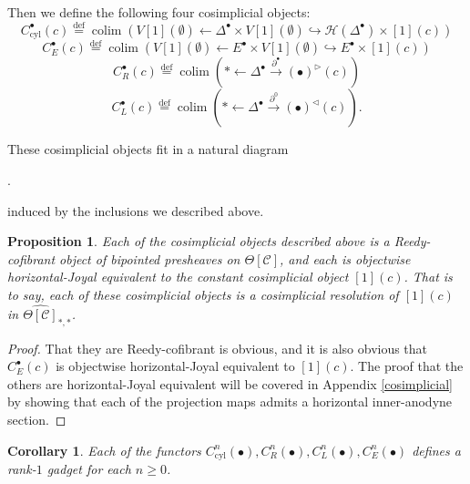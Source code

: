 \documentclass{amsart}
\numberwithin{equation}{section}
\theoremstyle{plain}   %
\newtheorem{prop}[subsection]{Proposition}
\newtheorem{cor}[subsection]{Corollary}
\theoremstyle{remark}
\theoremstyle{plain}
\DeclareMathOperator{\colim}{colim}
\newcommand{\C}{\ensuremath{\mathcal{C}}}
\newcommand{\defeq}{\overset{\mathrm{def}}=}
\newcommand{\cellset}{\ensuremath{\widehat{\Theta[\mathcal{C}]}}}
\begin{document}
Then we define the following four cosimplicial objects:
\[C^\bullet_{\mathrm{cyl}}(c)\defeq \colim \left( V[1](\emptyset) \leftarrow \Delta^\bullet \times V[1](\emptyset) \hookrightarrow \mathscr{H}(\Delta^\bullet)\times [1](c)\right)\]
\[C^\bullet_{E}(c)\defeq \colim \left( V[1](\emptyset) \leftarrow E^\bullet \times V[1](\emptyset) \hookrightarrow E^\bullet\times [1](c)\right)\]
\[C^\bullet_{R}(c)\defeq \colim \left( \ast \leftarrow \Delta^\bullet \xrightarrow{\partial^{\bullet}} (\bullet)^\triangleright(c)\right)\]
\[C^\bullet_{L}(c)\defeq \colim \left( \ast \leftarrow \Delta^\bullet \xrightarrow{\partial^0} (\bullet)^\triangleleft(c)\right).\]

These cosimplicial objects fit in a natural diagram
\begin{center}
	.
\end{center}
induced by the inclusions we described above.
\begin{prop}
	Each of the cosimplicial objects described above is a Reedy-cofibrant object of bipointed presheaves on \(\Theta[\C]\), and each is objectwise horizontal-Joyal equivalent to the constant cosimplicial object \([1](c)\).  That is to say, each of these cosimplicial objects is a cosimplicial resolution of \([1](c)\) in \(\cellset_{\ast,\ast}\).
\end{prop}
\begin{proof}
	That they are Reedy-cofibrant is obvious, and it is also obvious that \(C^\bullet_E(c)\) is objectwise horizontal-Joyal equivalent to \([1](c)\).  The proof that the others are horizontal-Joyal equivalent will be covered in Appendix \ref{cosimplicial} by showing that each of the projection maps admits a horizontal inner-anodyne section.
\end{proof}
\begin{cor}
	Each of the functors \(C^n_\mathrm{cyl}(\bullet), C^n_R(\bullet), C^n_L(\bullet), C^n_E(\bullet)\) defines a rank-\(1\) gadget for each \(n\geq 0\).
\end{cor}
\end{document}
